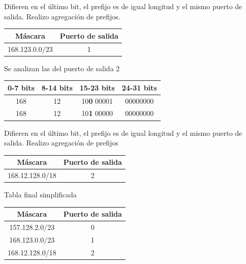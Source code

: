 \documentclass[titlepage,a4paper]{article}
\begin{document}
Difieren en el último bit, el prefijo es de igual longitud y el mismo puerto de salida. Realizo agregación de prefijos.


\begin{center}
    \begin{tabular}{c|c}
        Máscara & Puerto de salida \\
        \hline
        \hline
        168.123.0.0/23 &  1 \\
    \end{tabular}
\end{center}

Se analizan las del puerto de salida 2

\begin{center}
    \begin{tabular}{c|c|c|c}
        0-7 bits & 8-14 bits & 15-23 bits & 24-31 bits \\
        \hline
        \hline
        168 & 12 & 10\textbf{0} 00001 & 00000000 \\
        \hline
        168 & 12 & 10\textbf{1} 00000 & 00000000 \\
    \end{tabular}
\end{center}

Difieren en el último bit, el prefijo es de igual longitud y el mismo puerto de salida. Realizo agregación de prefijos 

\begin{center}
    \begin{tabular}{c|c}
        Máscara & Puerto de salida \\
        \hline
        \hline
        168.12.128.0/18 &  2 \\
    \end{tabular}
\end{center}

Tabla final simplificada

\begin{center}
    \begin{tabular}{c|c}
        Máscara & Puerto de salida \\
        \hline
        \hline
        157.128.2.0/23 &  0\\
        \hline
        168.123.0.0/23 &  1 \\
        \hline
        168.12.128.0/18 &  2 \\
    \end{tabular}
\end{center}
\end{document}
